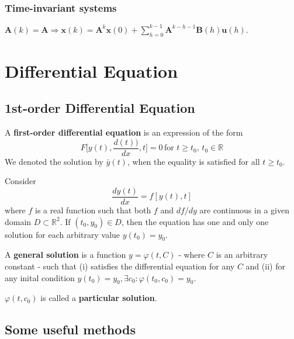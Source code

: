 \subsubsection{Time-invariant systems} $\mathbf{A}(k) = \mathbf{A} \Longrightarrow \mathbf{x}(k) = \mathbf{A}^{k}\mathbf{x}(0) + \sum_{h = 0}^{k - 1}\mathbf{A}^{k - h - 1}\mathbf{B}(h)\mathbf{u}(h).
$

\section{Differential Equation}

\subsection{1st-order Differential Equation}

\begin{definition}
    A \textbf{first-order differential equation} is an expression of the form \[
        F\Big[y(t), \frac{d(t))}{dx}, t\Big] = 0 \, \text{for } t \geq t_0, \, t_0 \in \mathbb{R}
    \]
    We denoted the solution by $\bar{y}(t)$, when the equality is satisfied for all $t \geq t_0$.
\end{definition}

\begin{theorem} Consider \[
        \frac{dy(t)}{dx} = f[y(t),t]
    \] where $f$ is a real function such that both $f$ and $df/dy$ are continuous in a given domain $D \subset \mathbb{R}^{2}$. If $(t_0,y_0) \in D$, then the equation has one and only one solution for each arbitrary value $y(t_0) = y_0$.
\end{theorem}

\begin{definition}
    A \textbf{general solution} is a function $y=\varphi(t,C)$ - where $C$ is an arbitrary constant - such that (i) satisfies the differential equation for any $C$ and (ii) for any inital condition $y(t_0) = y_0, \exists c_0: \varphi (t_0,c_0) = y_0$.
\end{definition}

\begin{definition}
    $\varphi(t,c_0)$ is called a \textbf{particular solution}.
\end{definition}

\subsection{Some useful methods}

